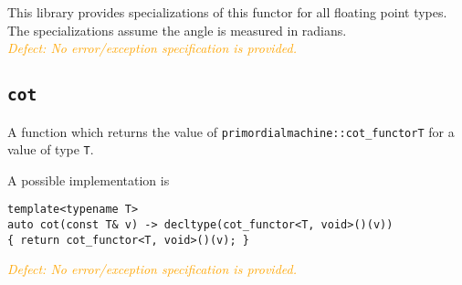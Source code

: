 \documentclass[oneside]{article}
\begin{document}
\noindent{}This library provides specializations of this functor for all floating point types.
The specializations assume the angle is measured in radians.\\

\noindent{}\textcolor{orange}{\textit{Defect: No error/exception specification is provided.}}

\subsection{\texttt{cot}}
A function which returns the value of \texttt{primordialmachine::cot\_functor\textlangle T\textrangle}
for a value of type \texttt{T}.

\noindent{}A possible implementation is
\begin{verbatim}
template<typename T>
auto cot(const T& v) -> decltype(cot_functor<T, void>()(v))
{ return cot_functor<T, void>()(v); }
\end{verbatim}

\noindent{}\textcolor{orange}{\textit{Defect: No error/exception specification is provided.}}
\end{document}
